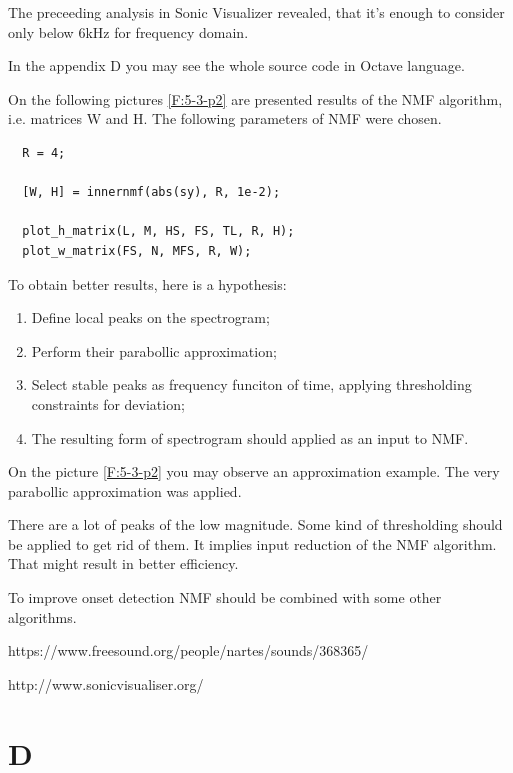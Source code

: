 \documentclass{amsart}
\begin{document}
The preceeding analysis in Sonic Visualizer \cite{L:sonic-visualizer}
revealed, that it's enough to consider only below 6kHz for frequency domain.

In the appendix D you may see the whole source code in Octave language.

On the following pictures \ref{F:5-3-p2}
are presented results of the NMF algorithm,
i.e. matrices W and H.
The following parameters of NMF were chosen.
\begin{verbatim}
  R = 4;

  [W, H] = innernmf(abs(sy), R, 1e-2);

  plot_h_matrix(L, M, HS, FS, TL, R, H);
  plot_w_matrix(FS, N, MFS, R, W);
\end{verbatim}

To obtain better results, here is a hypothesis:
\begin{enumerate}
  \item Define local peaks on the spectrogram;
  \item Perform their parabollic approximation;
  \item Select stable peaks as frequency funciton of time,
    applying thresholding constraints for deviation;
  \item The resulting form of spectrogram should applied as an input to NMF.
\end{enumerate}

On the picture \ref{F:5-3-p2} you may observe an approximation example.
The very parabollic approximation was applied.

There are a lot of peaks of the low magnitude. Some kind of thresholding
should be applied to get rid of them. It implies input reduction of the NMF
algorithm. That might result in better efficiency.

To improve onset detection NMF should be combined with some other algorithms.

\begin{thebibliography}{0}

   https://www.freesound.org/people/nartes/sounds/368365/ 

   http://www.sonicvisualiser.org/
\end{thebibliography}

\appendix

\section{D}\label{A:realaudio_nmf_post.m}
\end{document}
